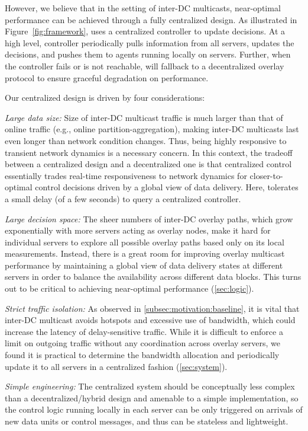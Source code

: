 However, we believe that in the setting of inter-DC multicasts, near-optimal performance can be achieved through a fully centralized design. As illustrated in Figure~\ref{fig:framework}, \name uses a centralized controller to update decisions. At a high level, \name controller periodically pulls information from all servers, updates the decisions, and pushes them to agents running locally on servers. Further, when the controller fails or is not reachable, \name will fallback to a decentralized overlay protocol to ensure graceful degradation on performance.

Our centralized design is driven by four considerations:
\begin{packedenumerate}
\item {\em Large data size:}
Size of inter-DC multicast traffic is much larger than that of online traffic (e.g., online partition-aggregation), making inter-DC multicasts last even longer than network condition changes. Thus, being highly responsive to transient network dynamics is a necessary concern. In this context, the tradeoff between a centralized design and a decentralized one is that centralized control essentially trades real-time responsiveness to network dynamics for closer-to-optimal control decisions driven by a global view of data delivery. Here, \name tolerates a small delay (of a few seconds) to query a centralized controller.

\item {\em Large decision space:}
The sheer numbers of inter-DC overlay paths,
which grow exponentially with more servers acting as overlay nodes,
make it hard for individual servers to explore all possible overlay
paths based only on its local measurements.
Instead, there is a great room for improving overlay multicast
performance by maintaining a global view of data delivery states at
different servers in order to balance the availability across
different data blocks. This turns out to be critical to achieving near-optimal performance (\Section\ref{sec:logic}).
\item {\em Strict traffic isolation:}
As observed in \Section\ref{subsec:motivation:baseline}, it is vital that inter-DC
multicast avoids hotspots and excessive use of
bandwidth, which could increase the latency of delay-sensitive traffic.
While it is difficult to enforce a limit on outgoing traffic
without any coordination across overlay servers, we found it is practical
to determine the bandwidth allocation and periodically update it
to all servers in a centralized fashion (\Section\ref{sec:system}).
\item {\em Simple engineering:}
The centralized system should be conceptually less complex than a decentralized/hybrid design and amenable to a simple implementation, so the control logic running locally in each server can be only triggered on arrivals of new data units or control messages, and thus can be stateless and lightweight.

\end{packedenumerate}

